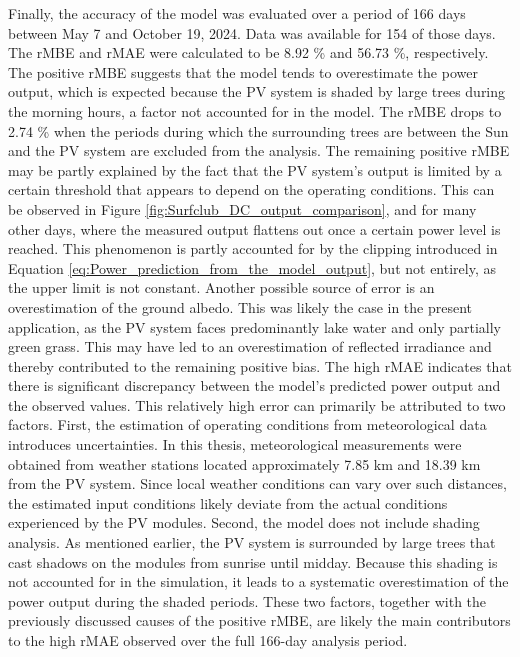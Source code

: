 Finally, the accuracy of the model was evaluated over a period of
166 days between May 7 and October 19, 2024. Data was available
for 154 of those days. The rMBE and rMAE were calculated to be
8.92 \% and 56.73 \%, respectively. The positive rMBE suggests
that the model tends to overestimate the power output, which is
expected because the PV system is shaded by large trees during
the morning hours, a factor not accounted for in the model.
The rMBE drops to 2.74 \% when the periods during which the
surrounding trees are between the Sun and the PV system are
excluded from the analysis. The remaining positive rMBE may
be partly explained by the fact that the PV system's output
is limited by a certain threshold that appears to depend
on the operating conditions. This can be observed in Figure
\ref{fig:Surfclub_DC_output_comparison}, and for many other days,
where the measured output flattens out once a certain power
level is reached. This phenomenon is partly accounted for by
the clipping introduced in Equation
\ref{eq:Power_prediction_from_the_model_output}, but not entirely,
as the upper limit is not constant. 
Another possible source of error is an overestimation of the ground albedo.
This was likely the case in the present application, as the PV system faces
predominantly lake water and only partially green grass. This may have led
to an overestimation of reflected irradiance and thereby contributed to
the remaining positive bias. The high rMAE indicates that there is
significant discrepancy between the model's predicted power output
and the observed values.
This relatively high error can primarily be attributed to two factors.
First, the estimation of operating conditions from meteorological data
introduces uncertainties. In this thesis, meteorological measurements
were obtained from weather stations located approximately 7.85 km and
18.39 km from the PV system. Since local weather conditions can vary
over such distances, the estimated input conditions likely
deviate from the actual conditions experienced by the PV modules.
Second, the model does not include shading analysis. As mentioned
earlier, the PV system is surrounded by large trees that cast shadows
on the modules from sunrise until midday. Because this shading is not
accounted for in the simulation, it leads to a systematic overestimation
of the power output during the shaded periods. These two factors,
together with the previously discussed causes of the positive rMBE,
are likely the main contributors to the high rMAE observed over the
full 166-day analysis period.

